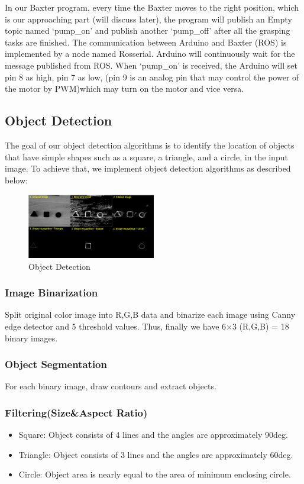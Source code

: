 \documentclass[conference,a4paper]{IEEEtran}
\begin{document}
In our Baxter program, every time the Baxter moves to the right position, which is our approaching part (will discuss later), the program will publish an Empty topic named `pump\_on' and publish another `pump\_off' after all the grasping tasks are finished. The communication between Arduino and Baxter (ROS) is implemented by a node named Rosserial. Arduino will continuously wait for the message published from ROS. When `pump\_on' is received, the Arduino will set pin 8 as high,  pin 7 as low, (pin 9 is an analog pin that may control the power of the motor by PWM)which may turn on the motor and vice versa.


\subsection{Object Detection}
The goal of our object detection algorithms is to identify the location of objects that have simple shapes such as a square, a triangle, and a circle, in the input image. To achieve that, we implement object detection algorithms as described below:

\begin{figure}[h]
\centering
\includegraphics[width=0.5\textwidth]{ObjectDetection.png}
\caption{Object Detection}
\label{fig:Object Detection}
\end{figure}

\subsubsection{Image Binarization}
Split original color image into R,G,B data and binarize each image using Canny edge detector and 5 threshold values. Thus, finally we have 6$\times$3 (R,G,B) = 18 binary images. 
\subsubsection{Object Segmentation}
For each binary image, draw contours and extract objects.
\subsubsection{Filtering(Size\&Aspect Ratio)}
\begin{itemize}
\item Square: Object consists of 4 lines and the angles are approximately 90deg.
\item Triangle: Object consists of 3 lines and the angles are approximately 60deg.
\item Circle: Object area is nearly equal to the area of minimum enclosing circle.
\end{itemize}
\end{document}
